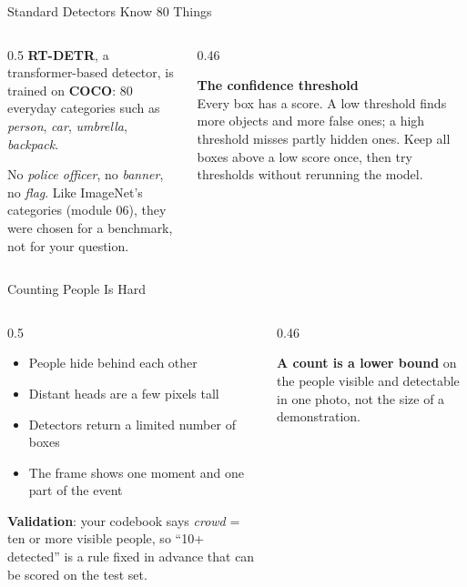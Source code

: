 \begin{frame}{Standard Detectors Know 80 Things}
\begin{columns}[T]
\begin{column}{0.5\textwidth}
\textbf{RT-DETR}, a transformer-based detector, is trained on \textbf{COCO}: 80 everyday
categories such as \emph{person}, \emph{car}, \emph{umbrella}, \emph{backpack}.

\vspace{0.15cm}
No \emph{police officer}, no \emph{banner}, no \emph{flag}. Like ImageNet's categories (module 06),
they were chosen for a benchmark, not for your question.
\end{column}
\begin{column}{0.46\textwidth}
\begin{graybox}
\textbf{The confidence threshold}\\
Every box has a score. A low threshold finds more objects and more false ones; a high threshold
misses partly hidden ones. Keep all boxes above a low score once, then try thresholds without
rerunning the model.
\end{graybox}
\end{column}
\end{columns}
\end{frame}

\begin{frame}{Counting People Is Hard}
\begin{columns}[T]
\begin{column}{0.5\textwidth}
\begin{itemize}
\item People hide behind each other
\item Distant heads are a few pixels tall
\item Detectors return a limited number of boxes
\item The frame shows one moment and one part of the event
\end{itemize}

\vspace{0.15cm}
\textbf{Validation}: your codebook says \emph{crowd} = ten or more visible people, so ``10+
detected'' is a rule fixed in advance that can be scored on the test set.
\end{column}
\begin{column}{0.46\textwidth}
\begin{warnbox}
\textbf{A count is a lower bound} on the people visible and detectable in one photo, not the size
of a demonstration.
\end{warnbox}
\end{column}
\end{columns}
\end{frame}

